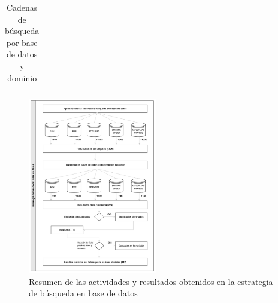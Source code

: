 \begin{table}[htbp]
\begin{adjustbox}{max width=\textwidth}
\begin{tabular}{|P{0.15\linewidth}|P{0.25\linewidth}|P{0.25\linewidth}|P{0.25\linewidth}|}
\end{tabular}
\end{adjustbox}
\caption{Cadenas de búsqueda por base de datos y dominio}\label{tab:cadenas-busqueda-transpuesta}
\end{table}


\begin{figure}[tbp]
    \centering
    \includegraphics[width=0.5\textwidth]{resources/images/busqueda-estudios/busqueda-bd.png}
    \caption{Resumen de las actividades y resultados obtenidos en la estrategia de búsqueda en base de datos}\label{fig:resumen-busqueda-bds}
\end{figure}

